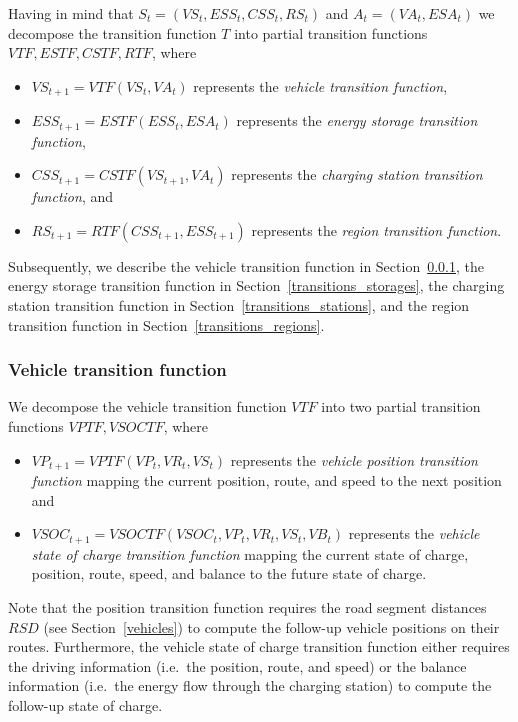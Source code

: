 Having in mind that $S_t = (VS_t, ESS_t, CSS_t, RS_t)$ and $A_t = (VA_t, ESA_t)$ we decompose the transition function $T$ into partial transition functions $VTF,ESTF,CSTF,RTF$, where
\begin{itemize}
	\item $VS_{t+1} = VTF(VS_t, VA_t)$ represents the \textit{vehicle transition function},
	\item $ESS_{t+1} = ESTF(ESS_t, ESA_t)$ represents the \textit{energy storage transition function},
	\item $CSS_{t+1} = CSTF(VS_{t+1}, VA_t)$ represents the \textit{charging station transition function}, and
	\item $RS_{t+1} = RTF(CSS_{t+1}, ESS_{t+1})$ represents the \textit{region transition function}.
\end{itemize}
Subsequently, we describe the vehicle transition function in Section~\ref{transitions_vehicles}, the energy storage transition function in Section~\ref{transitions_storages}, the charging station transition function in Section~\ref{transitions_stations}, and the region transition function in Section~\ref{transitions_regions}.

\subsubsection{Vehicle transition function}
\label{transitions_vehicles}

We decompose the vehicle transition function $VTF$ into two partial transition functions $VPTF,VSOCTF$, where
\begin{itemize}
	\item $VP_{t+1} = VPTF(VP_t, VR_t, VS_t)$ represents the \textit{vehicle position transition function} mapping the current position, route, and speed to the next position and
	\item $VSOC_{t+1} = VSOCTF(VSOC_t, VP_t, VR_t, VS_t, VB_t)$ represents the \textit{vehicle state of charge transition function} mapping the current state of charge, position, route, speed, and balance to the future state of charge.
\end{itemize}
Note that the position transition function requires the road segment distances $RSD$ (see Section~\ref{vehicles}) to compute the follow-up vehicle positions on their routes. Furthermore, the vehicle state of charge transition function either requires the driving information (i.e.\ the position, route, and speed) or the balance information (i.e.\ the energy flow through the charging station) to compute the follow-up state of charge.

